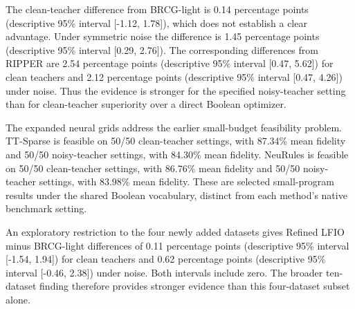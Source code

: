 The clean-teacher difference from BRCG-light is 0.14 percentage points (descriptive 95\% interval [-1.12, 1.78]), which does not establish a clear advantage. Under symmetric noise the difference is 1.45 percentage points (descriptive 95\% interval [0.29, 2.76]). The corresponding differences from RIPPER are 2.54 percentage points (descriptive 95\% interval [0.47, 5.62]) for clean teachers and 2.12 percentage points (descriptive 95\% interval [0.47, 4.26]) under noise. Thus the evidence is stronger for the specified noisy-teacher setting than for clean-teacher superiority over a direct Boolean optimizer.

The expanded neural grids address the earlier small-budget feasibility problem. TT-Sparse is feasible on 50/50 clean-teacher settings, with 87.34\% mean fidelity and 50/50 noisy-teacher settings, with 84.30\% mean fidelity. NeuRules is feasible on 50/50 clean-teacher settings, with 86.76\% mean fidelity and 50/50 noisy-teacher settings, with 83.98\% mean fidelity. These are selected small-program results under the shared Boolean vocabulary, distinct from each method's native benchmark setting.

An exploratory restriction to the four newly added datasets gives Refined LFIO minus BRCG-light differences of 0.11 percentage points (descriptive 95\% interval [-1.54, 1.94]) for clean teachers and 0.62 percentage points (descriptive 95\% interval [-0.46, 2.38]) under noise. Both intervals include zero. The broader ten-dataset finding therefore provides stronger evidence than this four-dataset subset alone.
